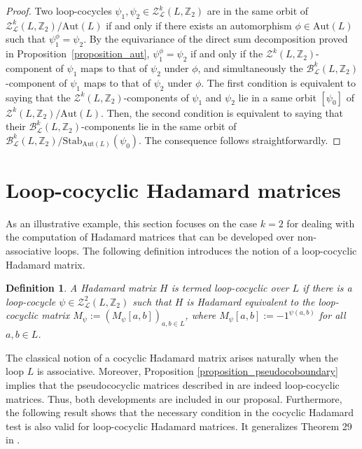 \documentclass[11pt,a4paper]{article}
\newtheorem{definition}[theorem]{Definition}
\begin{document}
\begin{proof} Two loop-cocycles $\psi_1,\psi_2\in \mathcal{Z}_\mathcal{L}^k(L,\mathbb{Z}_2)$ are in the same orbit of $\mathcal{Z}_\mathcal{L}^k(L,\mathbb{Z}_2)/\mathrm{Aut}(L)$ if and only if there exists an automorphism $\phi\in\mathrm{Aut}(L)$ such that $\psi_1^\phi = \psi_2$. By the equivariance of the direct sum decomposition proved in Proposition~\ref{proposition_aut}, $\psi_1^\phi = \psi_2$ if and only if the $\mathcal{Z}^k(L,\mathbb{Z}_2)$-component of $\psi_1$ maps to that of $\psi_2$
under $\phi$, and simultaneously the $\mathcal{B}_\mathcal{L}^k(L,\mathbb{Z}_2)$-component of $\psi_1$ maps to that of $\psi_2$ under $\phi$. The first condition is equivalent to saying that the $\mathcal{Z}^k(L,\mathbb{Z}_2)$-components of $\psi_1$ and $\psi_2$ lie in a same orbit $[\psi_0]$ of $\mathcal{Z}^k(L,\mathbb{Z}_2)/\mathrm{Aut}(L)$. Then, the second condition is equivalent to saying that their $\mathcal{B}_\mathcal{L}^k(L,\mathbb{Z}_2)$-components lie in the same orbit of $\mathcal{B}_\mathcal{L}^k(L,\mathbb{Z}_2)/\mathrm{Stab}_{\mathrm{Aut}(L)}(\psi_0)$. The consequence follows straightforwardly.
\end{proof}

\section{Loop-cocyclic Hadamard matrices}\label{sec:hadamard}

As an illustrative example, this section focuses on the case $k=2$ for dealing with the computation of Hadamard matrices that can be developed over non-associative loops. The following definition introduces the notion of a loop-cocyclic Hadamard matrix.

\begin{definition}\label{def_L_cocyclic_Hadamard}
A Hadamard matrix $H$ is termed {\em loop-cocyclic over $L$} if there is a loop-cocycle $\psi\in \mathcal{Z}_\mathcal{L}^2(L,\mathbb{Z}_2)$ such that $H$ is Hadamard equivalent to the {\em loop-cocyclic matrix} $M_\psi:=\left(M_\psi[a,b]\right)_{a,b\in L}$, where $M_\psi[a,b]:=-1^{\psi(a,b)}$ for all $a,b\in L$.
\end{definition}

The classical notion of a cocyclic Hadamard matrix arises naturally when the loop $L$ is associative. Moreover, Proposition \ref{proposition_pseudocoboundary} implies that the pseudococyclic matrices described in \citep{Alvarez2020} are indeed loop-cocyclic matrices. Thus, both developments are included in our proposal. Furthermore, the following result shows that the necessary condition in the cocyclic Hadamard test is also valid for loop-cocyclic Hadamard matrices. It generalizes Theorem 29 in \citep{Alvarez2019}.
\end{document}
